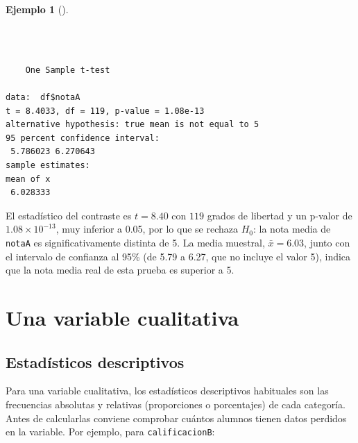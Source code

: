 \documentclass[
  spanish,
  a4paper,
]{scrreport}
\newenvironment{Shaded}{\begin{snugshade}}{\end{snugshade}}
\newcommand{\AttributeTok}[1]{\textcolor[rgb]{0.40,0.45,0.13}{#1}}
\newcommand{\DecValTok}[1]{\textcolor[rgb]{0.68,0.00,0.00}{#1}}
\newcommand{\FunctionTok}[1]{\textcolor[rgb]{0.28,0.35,0.67}{#1}}
\newcommand{\NormalTok}[1]{\textcolor[rgb]{0.00,0.23,0.31}{#1}}
\newcommand{\SpecialCharTok}[1]{\textcolor[rgb]{0.37,0.37,0.37}{#1}}
\newcommand{\StringTok}[1]{\textcolor[rgb]{0.13,0.47,0.30}{#1}}
\theoremstyle{definition}
\newtheorem{example}{Ejemplo}[chapter]
\theoremstyle{definition}
\theoremstyle{remark}
\begin{document}
\begin{example}[]\protect\hypertarget{exm-unapoblacion-test-t-media}{}\label{exm-unapoblacion-test-t-media}

~

\begin{Shaded}
\end{Shaded}

\begin{verbatim}

    One Sample t-test

data:  df$notaA
t = 8.4033, df = 119, p-value = 1.08e-13
alternative hypothesis: true mean is not equal to 5
95 percent confidence interval:
 5.786023 6.270643
sample estimates:
mean of x 
 6.028333 
\end{verbatim}

El estadístico del contraste es \(t=8.40\) con \(119\) grados de
libertad y un p-valor de \(1.08\times10^{-13}\), muy inferior a 0.05,
por lo que se rechaza \(H_0\): la nota media de \texttt{notaA} es
significativamente distinta de 5. La media muestral, \(\bar{x}=6.03\),
junto con el intervalo de confianza al 95\% (de 5.79 a 6.27, que no
incluye el valor 5), indica que la nota media real de esta prueba es
superior a 5.

\end{example}

\section{Una variable cualitativa}\label{una-variable-cualitativa}

\subsection{Estadísticos
descriptivos}\label{estaduxedsticos-descriptivos-1}

Para una variable cualitativa, los estadísticos descriptivos habituales
son las frecuencias absolutas y relativas (proporciones o porcentajes)
de cada categoría. Antes de calcularlas conviene comprobar cuántos
alumnos tienen datos perdidos en la variable. Por ejemplo, para
\texttt{calificacionB}:

\begin{Shaded}
\end{Shaded}
\end{document}
